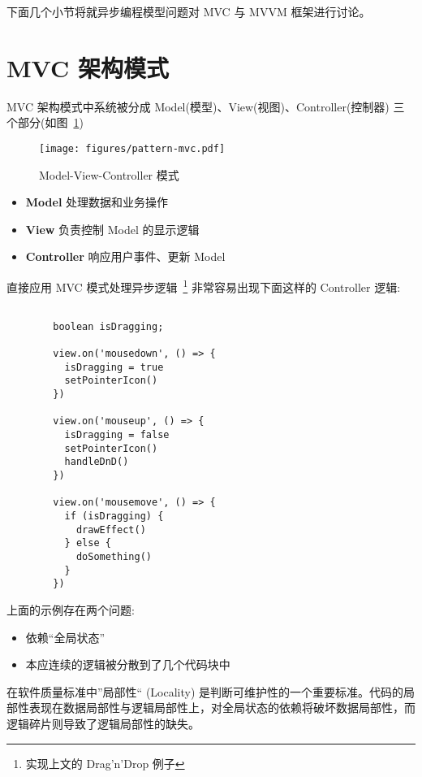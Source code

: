下面几个小节将就异步编程模型问题对 MVC 与 MVVM 框架进行讨论。

\section{MVC 架构模式}

MVC 架构模式中系统被分成 Model(模型)、View(视图)、Controller(控制器) 三个部分(如图~\ref{PatternMVC})

\begin{figure}[!h]
  \begin{center}
    \texttt{[image: figures/pattern-mvc.pdf]}
    \caption{Model-View-Controller 模式\label{PatternMVC}}
  \end{center}
\end{figure}

\begin{itemize}
  \item \textbf{Model} 处理数据和业务操作
  \item \textbf{View} 负责控制 Model 的显示逻辑
  \item \textbf{Controller} 响应用户事件、更新 Model
\end{itemize}

直接应用 MVC 模式处理异步逻辑~\footnote{实现上文的 Drag'n'Drop 例子} 非常容易出现下面这样的 Controller 逻辑:

\begin{verbatim}

        boolean isDragging;

        view.on('mousedown', () => {
          isDragging = true
          setPointerIcon()
        })

        view.on('mouseup', () => {
          isDragging = false
          setPointerIcon()
          handleDnD()
        })

        view.on('mousemove', () => {
          if (isDragging) {
            drawEffect()
          } else {
            doSomething()
          }
        })

\end{verbatim}

上面的示例存在两个问题:

\begin{itemize}
  \item 依赖“全局状态”
  \item 本应连续的逻辑被分散到了几个代码块中
\end{itemize}

在软件质量标准中”局部性“ (Locality) 是判断可维护性的一个重要标准。代码的局部性表现在数据局部性与逻辑局部性上，对全局状态的依赖将破坏数据局部性，而逻辑碎片则导致了逻辑局部性的缺失。

